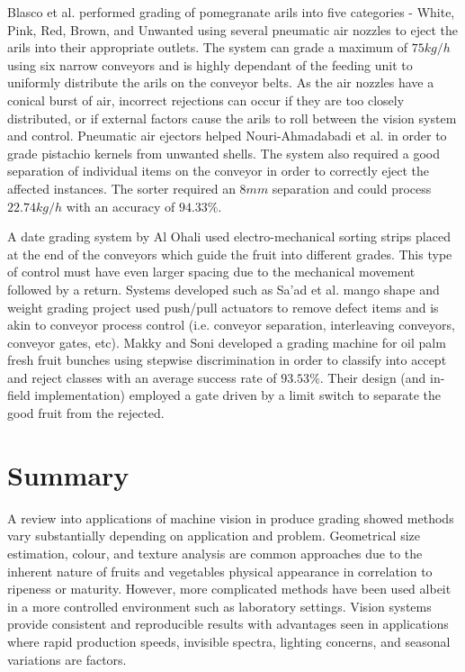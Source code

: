 \documentclass[fleqn,twoside,12pt]{report}
\begin{document}
Blasco et al.\cite{blasco} performed grading of pomegranate arils into five categories - White, Pink, Red, Brown, and Unwanted using several pneumatic air nozzles to eject the arils into their appropriate outlets. The system can grade a maximum of $75kg/h$ using six narrow conveyors and is highly dependant of the feeding unit to uniformly distribute the arils on the conveyor belts. As the air nozzles have a conical burst of air, incorrect rejections can occur if they are too closely distributed, or if external factors cause the arils to roll between the vision system and control. Pneumatic air ejectors helped Nouri-Ahmadabadi et al.\cite{nouri-ahmadabadi} in order to grade pistachio kernels from unwanted shells. The system also required a good separation of individual items on the conveyor in order to correctly eject the affected instances. The sorter required an $8mm$ separation and could process $22.74kg/h$ with an accuracy of $94.33\%$. 

A date grading system by Al Ohali \cite{ohali} used electro-mechanical sorting strips placed at the end of the conveyors which guide the fruit into different grades. This type of control must have even larger spacing due to the mechanical movement followed by a return. Systems developed such as Sa'ad et al.\cite{saad} mango shape and weight grading project used push/pull actuators to remove defect items and is akin to conveyor process control (i.e. conveyor separation, interleaving conveyors, conveyor gates, etc). Makky and Soni \cite{makky} developed a grading machine for oil palm fresh fruit bunches using stepwise discrimination in order to classify into accept and reject classes with an average success rate of $93.53\%$. Their design (and in-field implementation) employed a gate driven by a limit switch to separate the good fruit from the rejected.




\section{Summary}


A review into applications of machine vision in produce grading showed methods vary substantially depending on application and problem. Geometrical size estimation, colour, and texture analysis are common approaches due to the inherent nature of fruits and vegetables physical appearance in correlation to ripeness or maturity. However, more complicated methods have been used albeit in a more controlled environment such as laboratory settings. Vision systems provide consistent and reproducible results with advantages seen in applications where rapid production speeds, invisible spectra, lighting concerns, and seasonal variations are factors.
\end{document}
